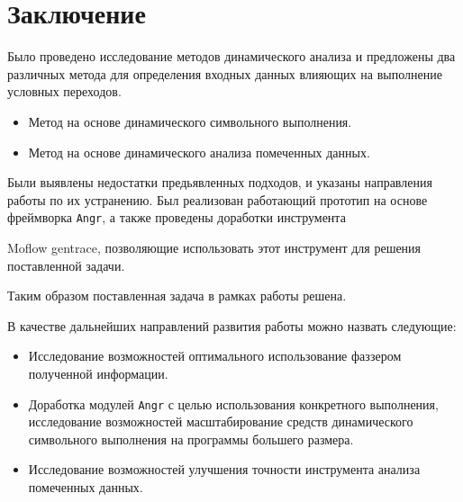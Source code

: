 \bigskip
\chapter*{Заключение}

Было проведено исследование методов динамического анализа и предложены два различных метода для определения входных данных влияющих на выполнение условных переходов.

\begin{itemize}
    \item Метод на основе динамического символьного выполнения.
    \item Метод на основе динамического анализа помеченных данных.
\end{itemize}

Были выявлены недостатки предьявленных подходов, и указаны направления работы по их устранению. Был реализован работающий прототип на основе фреймворка \texttt{Angr}, а также проведены доработки инструмента \item{Moflow gentrace}, позволяющие использовать этот инструмент для решения поставленной задачи.

Таким образом поставленная задача в рамках работы решена.

В качестве дальнейших направлений развития работы можно назвать следующие:

\begin{itemize}
    \item Исследование возможностей оптимального использование фаззером полученной информации.
    \item Доработка модулей \texttt{Angr} с целью использования конкретного выполнения, исследование возможностей масштабирование средств динамического символьного выполнения на программы большего размера.
    \item Исследование возможностей улучшения точности инструмента анализа помеченных данных.
\end{itemize}





